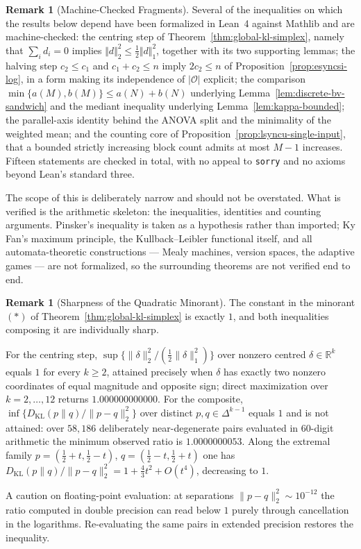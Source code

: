 \documentclass[12pt]{article}
\theoremstyle{definition}
\newtheorem{remark}[theorem]{Remark}
\begin{document}
\begin{remark}[Machine-Checked Fragments]
\label{rem:lean-formalization}
Several of the inequalities on which the results below depend have been
formalized in Lean~4 against Mathlib and are machine-checked: the centring step of
Theorem~\ref{thm:global-kl-simplex}, namely that $\sum_id_i=0$ implies
$\Vert d\Vert_2^2\le\tfrac12\Vert d\Vert_1^2$, together with its two
supporting lemmas; the halving step
$c_2\le c_1$ and $c_1+c_2\le n$ imply $2c_2\le n$ of
Proposition~\ref{prop:esyncsi-log}, in a form making its independence of
$|\mathcal O|$ explicit; the comparison
$\min\{a(M),b(M)\}\le a(N)+b(N)$ underlying
Lemma~\ref{lem:discrete-bv-sandwich} and the mediant inequality underlying
Lemma~\ref{lem:kappa-bounded}; the parallel-axis identity behind the ANOVA
split and the minimality of the weighted mean; and the counting core of
Proposition~\ref{prop:lsyncu-single-input}, that a bounded strictly increasing
block count admits at most $M-1$ increases.  Fifteen statements are checked in
total, with no appeal to \texttt{sorry} and no axioms beyond Lean's standard
three.

The scope of this is deliberately narrow and should not be overstated.  What is
verified is the arithmetic skeleton: the inequalities, identities and counting
arguments.  Pinsker's inequality is taken as a hypothesis rather than imported;
Ky Fan's maximum principle, the Kullback--Leibler functional itself, and all
automata-theoretic constructions --- Mealy machines, version spaces, the
adaptive games --- are not formalized, so the surrounding theorems are not
verified end to end.

\end{remark}

\begin{remark}[Sharpness of the Quadratic Minorant]
\label{rem:kl-minorant-sharp}
The constant in the minorant $(*)$ of Theorem~\ref{thm:global-kl-simplex} is
exactly $1$, and both inequalities composing it are individually sharp.

For the centring step, $\sup\{\|\delta\|_2^2/(\tfrac12\|\delta\|_1^2)\}$ over
nonzero centred $\delta\in\mathbb R^k$ equals $1$ for every $k\ge2$, attained
precisely when $\delta$ has exactly two nonzero coordinates of equal magnitude
and opposite sign; direct maximization over $k=2,\dots,12$ returns
$1.000000000000$.  For the composite, $\inf\{D_{\mathrm{KL}}(p\|q)/
\|p-q\|_2^2\}$ over distinct $p,q\in\Delta^{k-1}$ equals $1$ and is not
attained: over $58{,}186$ deliberately near-degenerate pairs evaluated in
$60$-digit arithmetic the minimum observed ratio is $1.0000000053$.  Along the
extremal family $p=(\tfrac12+t,\tfrac12-t)$, $q=(\tfrac12-t,\tfrac12+t)$ one
has $D_{\mathrm{KL}}(p\|q)/\|p-q\|_2^2=1+\tfrac43t^2+O(t^4)$, decreasing to $1$.

A caution on floating-point evaluation: at separations $\|p-q\|_2^2\sim10^{-12}$
the ratio computed in double precision can read below $1$ purely through
cancellation in the logarithms.  Re-evaluating the same pairs in extended
precision restores the inequality.
\end{remark}
\end{document}

